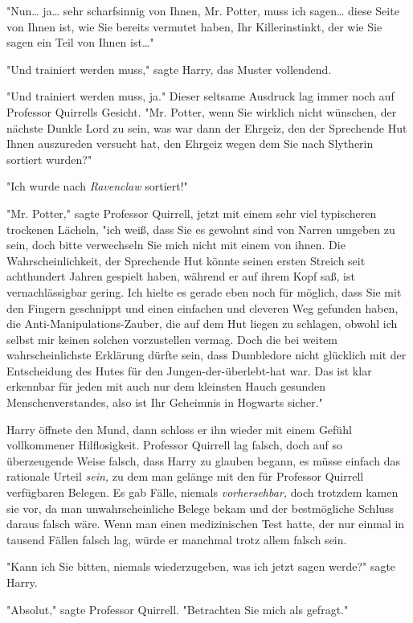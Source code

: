 {"Nun… ja… sehr scharfsinnig von Ihnen, Mr. Potter, muss ich sagen… diese Seite von Ihnen ist, wie Sie bereits vermutet haben, Ihr Killerinstinkt, der wie Sie sagen ein Teil von Ihnen ist…"

"Und trainiert werden muss," sagte Harry, das Muster vollendend.

"Und trainiert werden muss, ja." Dieser seltsame Ausdruck lag immer noch auf Professor Quirrells Gesicht. "Mr. Potter, wenn Sie wirklich nicht wünschen, der nächste Dunkle Lord zu sein, was war dann der Ehrgeiz, den der Sprechende Hut Ihnen auszureden versucht hat, den Ehrgeiz wegen dem Sie nach Slytherin sortiert wurden?"

"Ich wurde nach \emph{Ravenclaw} sortiert!"

"Mr. Potter," sagte Professor Quirrell, jetzt mit einem sehr viel typischeren trockenen Lächeln, "ich weiß, dass Sie es gewohnt sind von Narren umgeben zu sein, doch bitte verwechseln Sie mich nicht mit einem von ihnen. Die Wahrscheinlichkeit, der Sprechende Hut könnte seinen ersten Streich seit achthundert Jahren gespielt haben, während er auf ihrem Kopf saß, ist vernachlässigbar gering. Ich hielte es gerade eben noch für möglich, dass Sie mit den Fingern geschnippt und einen einfachen und cleveren Weg gefunden haben, die Anti-Manipulations-Zauber, die auf dem Hut liegen zu schlagen, obwohl ich selbst mir keinen solchen vorzustellen vermag. Doch die bei weitem wahrscheinlichste Erklärung dürfte sein, dass Dumbledore nicht glücklich mit der Entscheidung des Hutes für den Jungen-der-überlebt-hat war. Das ist klar erkennbar für jeden mit auch nur dem kleinsten Hauch gesunden Menschenverstandes, also ist Ihr Geheimnis in Hogwarts sicher."

Harry öffnete den Mund, dann schloss er ihn wieder mit einem Gefühl vollkommener Hilflosigkeit. Professor Quirrell lag falsch, doch auf so überzeugende Weise falsch, dass Harry zu glauben begann, es müsse einfach das rationale Urteil \emph{sein,} zu dem man gelänge mit den für Professor Quirrell verfügbaren Belegen. Es gab Fälle, niemals \emph{vorhersehbar,} doch trotzdem kamen sie vor, da man unwahrscheinliche Belege bekam und der bestmögliche Schluss daraus falsch wäre. Wenn man einen medizinischen Test hatte, der nur einmal in tausend Fällen falsch lag, würde er manchmal trotz allem falsch sein.

"Kann ich Sie bitten, niemals wiederzugeben, was ich jetzt sagen werde?" sagte Harry.

"Absolut," sagte Professor Quirrell. "Betrachten Sie mich als gefragt."

}
